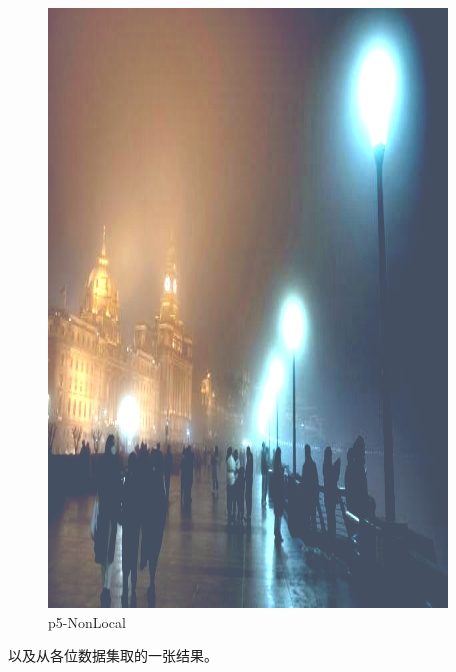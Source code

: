 \documentclass[12pt]{article}
\begin{document}
\begin{figure}[!h]
\begin{minipage}[t]{0.24\linewidth}
        \includegraphics[width=0.9\linewidth]{sample_pictures/after_p5_NonLocal.jpg}
        \caption*{p5-NonLocal}
    \end{minipage}
 \end{figure}\par
 以及从各位数据集取的一张结果。\par
\end{document}
